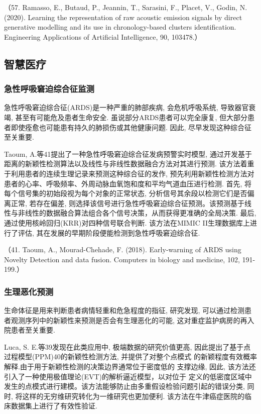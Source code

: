 \documentclass{Style/aas}
\begin{document}
\begin{multicols}{2}
  （57.	Ramasso, E., Butaud, P., Jeannin, T., Sarasini, F., Placet, V., Godin, N. (2020). Learning the representation of raw acoustic emission signals by direct generative modelling and its use in chronology-based clusters identification. Engineering Applications of Artificial Intelligence, 90, 103478.）

  \subsection{智慧医疗}
  \subsubsection{急性呼吸窘迫综合征监测}
  急性呼吸窘迫综合征(ARDS)是一种严重的肺部疾病, 会危机呼吸系统, 导致器官衰竭, 甚至有可能危及患者生命安全. 虽说部分ARDS患者可以完全康复, 但大部分患者即使痊愈也可能患有持久的肺损伤或其他健康问题. 因此, 尽早发现这种综合征至关重要.

  Taoum, A.等41提出了一种急性呼吸窘迫综合征发病预警实时模型, 通过开发基于距离的新颖性检测算法以及线性与非线性数据融合方法对其进行预测. 该方法着重于利用患者的连续生理记录来预测这种综合征的发作, 预先利用新颖性检测方法对患者的心率、呼吸频率、外周动脉血氧饱和度和平均气道血压进行检测. 首先, 将每个信号集的初始段视为每个对象的正常状态, 分析信号其余段以检测它们是否偏离正常, 若存在偏差, 则选择该信号进行急性呼吸窘迫综合征预测。该预测基于线性与非线性的数据融合算法组合各个信号决策，从而获得更准确的全局决策. 最后, 通过使用核岭回归(KRR)对四种信号联合判断. 该方法在MIMIC II生理数据库上进行了评估, 其在发展的早期阶段便能检测到急性呼吸窘迫综合征.

  （41.	Taoum, A., Mourad-Chehade, F. (2018). Early-warning of ARDS using Novelty Detection and data fusion. Computers in biology and medicine, 102, 191-199.）

  \subsubsection{生理恶化预测}
  生命体征是用来判断患者病情轻重和危急程度的指征, 研究发现, 可以通过检测患者观测序列中的新颖性来预测是否会有生理恶化的可能, 这对重症监护病房的再入院患者至关重要.

  Luca, S. E.等39发现在此类应用中, 极端数据的研究价值更高, 因此提出了基于点过程模型(PPM)40的新颖性检测方法, 并提供了对整个点模式 的新颖程度有效概率解释.由于用于新颖性检测的决策边界通常位于密度低的 支撑边缘, 因此, 该方法还引入了一种使用极值理论(EVT)的解析逼近模型，以对位于 定义的低密度区域中发生的点模式进行建模。该方法能够防止由多重假设检验问题引起的错误分类, 同时, 将这样的无穷维研究转化为一维研究也更加便利. 该方法在牛津癌症医院的临床数据集上进行了有效性验证.


\end{multicols}
\end{document}
